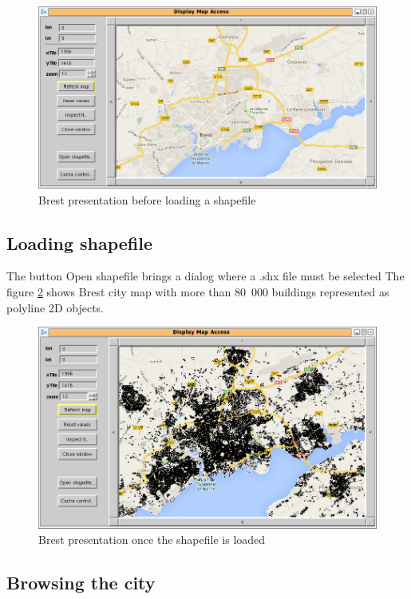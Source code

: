 \begin{figure}
\begin{center}
\includegraphics[width=12cm]{mapAccessWindow.png}
\caption{Brest presentation before loading a shapefile}
\label{fig:mapAccessMainWindow}
\end{center}
\end{figure}

\subsection{Loading shapefile}

The button Open shapefile brings a dialog where a .shx file must be selected 
The figure \ref{fig:mapAccessFilled} shows Brest city map with 
more than 80~000 buildings represented as polyline 2D objects. 

\begin{figure}
\begin{center}
\includegraphics[width=12cm]{mapAccessFilled.png}
\caption{Brest presentation once the shapefile is loaded}
\label{fig:mapAccessFilled}
\end{center}
\end{figure}

\subsection{Browsing the city}

